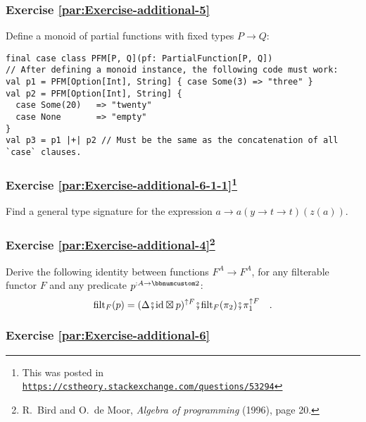 \subsubsection{Exercise \label{par:Exercise-additional-5}\ref{par:Exercise-additional-5}}

Define a monoid of partial functions with fixed types $P\rightarrow Q$:
\begin{lstlisting}
final case class PFM[P, Q](pf: PartialFunction[P, Q])
// After defining a monoid instance, the following code must work:
val p1 = PFM[Option[Int], String] { case Some(3) => "three" }
val p2 = PFM[Option[Int], String] {
  case Some(20)   => "twenty"
  case None       => "empty"
}
val p3 = p1 |+| p2 // Must be the same as the concatenation of all `case` clauses.
\end{lstlisting}


\subsubsection{Exercise \label{par:Exercise-additional-6-1-1}\ref{par:Exercise-additional-6-1-1}\protect\footnote{This was posted in \texttt{\protect\href{https://cstheory.stackexchange.com/questions/53294}{https://cstheory.stackexchange.com/questions/53294}}}}

Find a general type signature for the expression $a\rightarrow a(y\rightarrow t\rightarrow t)(z(a))$. 

\subsubsection{Exercise \label{par:Exercise-additional-4}\ref{par:Exercise-additional-4}\protect\footnote{R.~Bird and O.~de Moor, \emph{Algebra of programming} (1996), page
20.}}

Derive the following identity between functions $F^{A}\rightarrow F^{A}$,
for any filterable functor $F$ and any predicate $p^{:A\rightarrow\bbnum 2}$:
\[
\text{filt}_{F}(p)=(\Delta\bef\text{id}\boxtimes p)^{\uparrow F}\bef\text{filt}_{F}(\pi_{2})\bef\pi_{1}^{\uparrow F}\quad.
\]


\subsubsection{Exercise \label{par:Exercise-additional-6}\ref{par:Exercise-additional-6}}

